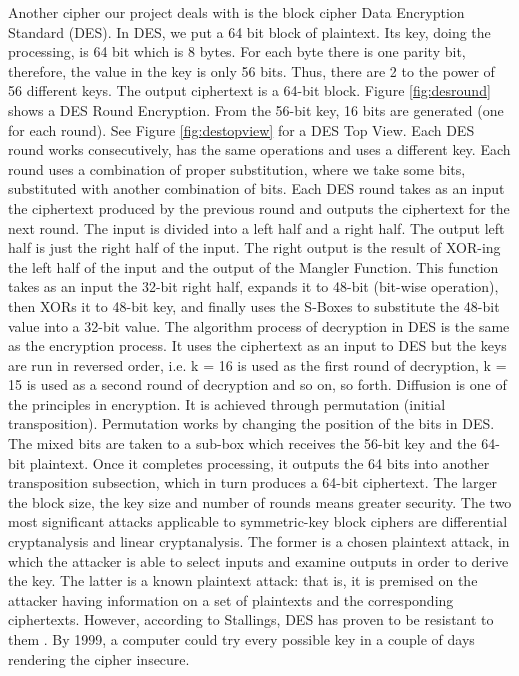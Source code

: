 Another cipher our project deals with is the block cipher Data Encryption Standard (DES). In DES, we put a 64 bit block of plaintext. Its key, doing the processing, is 64 bit which is 8 bytes. For each byte there is one parity bit, therefore, the value in the key is only 56 bits. Thus, there are 2 to the power of 56 different keys. The output ciphertext is a 64-bit block. 
Figure \ref{fig:desround} shows a DES Round Encryption. From the 56-bit key, 16 bits are generated (one for each round). See Figure \ref{fig:destopview} for a DES Top View. Each DES round works consecutively, has the same operations and uses a different key. Each round uses a combination of proper substitution, where we take some bits, substituted with another combination of bits. Each DES round takes as an input the ciphertext produced by the previous round and outputs the ciphertext for the next round. The input is divided into a left half and a right half. The output left half is just the right half of the input. The right output is the result of XOR-ing the left half of the input and the output of the Mangler Function. This function takes as an input the 32-bit right half, expands it to 48-bit (bit-wise operation), then XORs it to 48-bit key, and finally uses the S-Boxes to substitute the 48-bit value into a 32-bit value. 
The algorithm process of decryption in DES is the same as the encryption process. It uses the ciphertext as an input to DES but the keys are run in reversed order, i.e. k = 16 is used as the first round of decryption, k = 15 is used as a second round of decryption and so on, so forth. 
Diffusion is one of the principles in encryption. It is achieved through permutation (initial transposition). Permutation works by changing the position of the bits in DES. The mixed bits are taken to a sub-box which receives the 56-bit key and the 64-bit plaintext. Once it completes processing, it outputs the 64 bits into another transposition subsection, which in turn produces a 64-bit ciphertext. 
The larger the block size, the key size and number of rounds means greater security. The two most significant attacks applicable to symmetric-key block ciphers are differential cryptanalysis and linear cryptanalysis. The former is a chosen plaintext attack, in which the attacker is able to select inputs and examine outputs in order to derive the key. The latter is a known plaintext attack: that is, it is premised on the attacker having information on a set of plaintexts and the corresponding ciphertexts. However, according to Stallings, DES has proven to be resistant to them \cite{stallings2011-a}. By 1999, a computer could try every possible key in a couple of days rendering the cipher insecure.

